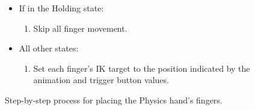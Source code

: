 \begin{figure}[H]
\begin{itemize}[noitemsep]
\begin{enumerate}[noitemsep]
\item Get the position that each finger would have according the the animation and trigger button value.
\item Find an intermediate position for the fingers slerping\footnote{SOMETHING ABOUT SLERPING HERE!} from the saved IK target position towards the animation position.
\item Set the IK target of the finger to the intermediate position found for it.
\end{enumerate}
\item If in the Holding state:
\begin{enumerate}[noitemsep]
\item Skip all finger movement.
\end{enumerate}
\item All other states:
\begin{enumerate}[noitemsep]
\item Set each finger's IK target to the position indicated by the animation and trigger button values.
\end{enumerate}
\end{itemize}
\caption{Step-by-step process for placing the Physics hand's fingers.}
\label{fig:stepByStepPhysicsHandFingers}
\end{figure}


